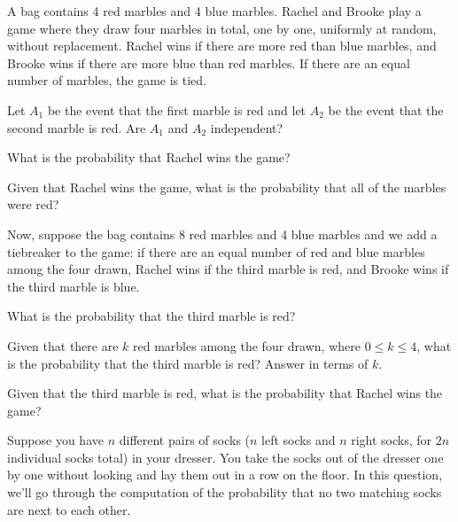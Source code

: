 \documentclass[11pt]{article}
\begin{document}
A bag contains 4 red marbles and 4 blue marbles. Rachel and Brooke play a game where they draw four marbles in total, one by one, uniformly at random, without replacement. Rachel wins if there are more red than blue marbles, and Brooke wins if there are more blue than red marbles. If there are an equal number of marbles, the game is tied.
\begin{Parts}
    \Part Let $A_1$ be the event that the first marble is red and let $A_2$ be the event that the second marble is red. Are $A_1$ and $A_2$ independent?
    
    \Part What is the probability that Rachel wins the game?
    
    \Part Given that Rachel wins the game, what is the probability that all of the marbles were red?
\end{Parts}
Now, suppose the bag contains 8 red marbles and 4 blue marbles and we add a tiebreaker to the game: if there are an equal number of red and blue marbles among the four drawn, Rachel wins if the third marble is red, and Brooke wins if the third marble is blue. 
\begin{Parts}[resume]
    \Part What is the probability that the third marble is red?
    
    \Part Given that there are $k$ red marbles among the four drawn, where $0 \leq k \leq 4$, what is the probability that the third marble is red? Answer in terms of $k$.
    
    \Part Given that the third marble is red, what is the probability that Rachel wins the game?
    
\end{Parts}

Suppose you have $n$ different pairs of socks ($n$ left socks and $n$ right socks, for $2n$ individual socks total) in your dresser. 
You take the socks out of the dresser one by one without looking and lay them out in a row on the floor. 
In this question, we'll go through the computation of the probability that no two matching socks are next to each other.
\end{document}
